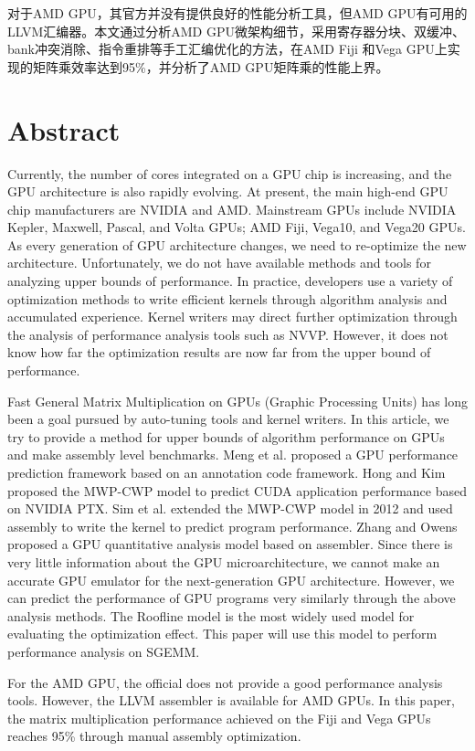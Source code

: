 对于AMD GPU，其官方并没有提供良好的性能分析工具，但AMD GPU有可用的LLVM汇编器。本文通过分析AMD GPU微架构细节，采用寄存器分块、双缓冲、bank冲突消除、指令重排等手工汇编优化的方法，在AMD Fiji 和Vega GPU上实现的矩阵乘效率达到95\%，并分析了AMD GPU矩阵乘的性能上界。

\chapter*{Abstract}%

Currently, the number of cores integrated on a GPU chip is increasing, and the GPU architecture is also rapidly evolving. At present, the main high-end GPU chip manufacturers are NVIDIA and AMD. Mainstream GPUs include NVIDIA Kepler, Maxwell, Pascal, and Volta GPUs; AMD Fiji, Vega10, and Vega20 GPUs. As every generation of GPU architecture changes, we need to re-optimize the new architecture. Unfortunately, we do not have available methods and tools for analyzing upper bounds of performance. In practice, developers use a variety of optimization methods to write efficient kernels through algorithm analysis and accumulated experience. Kernel writers may direct further optimization through the analysis of performance analysis tools such as NVVP. However, it does not know how far the optimization results are now far from the upper bound of performance.

Fast General Matrix Multiplication on GPUs (Graphic Processing Units) has long been a goal pursued by auto-tuning tools and kernel writers. In this article, we try to provide a method for upper bounds of algorithm performance on GPUs and make assembly level benchmarks. Meng et al. proposed a GPU performance prediction framework based on an annotation code framework. Hong and Kim proposed the MWP-CWP model to predict CUDA application performance based on NVIDIA PTX. Sim et al. extended the MWP-CWP model in 2012 and used assembly to write the kernel to predict program performance. Zhang and Owens proposed a GPU quantitative analysis model based on assembler. Since there is very little information about the GPU microarchitecture, we cannot make an accurate GPU emulator for the next-generation GPU architecture. However, we can predict the performance of GPU programs very similarly through the above analysis methods. The Roofline model is the most widely used model for evaluating the optimization effect. This paper will use this model to perform performance analysis on SGEMM.

For the AMD GPU, the official does not provide a good performance analysis tools. However, the LLVM assembler is available for AMD GPUs. In this paper, the matrix multiplication performance achieved on the Fiji and Vega GPUs reaches 95\% through manual assembly optimization.


